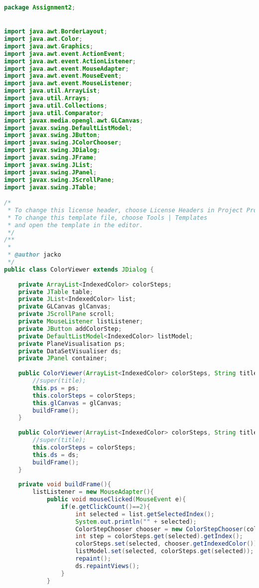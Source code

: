 \documentclass[pdftex,a4paper,10pt,titlepage]{article}
\begin{document}
\begin{lstlisting}[language=java, breaklines=true]
package Assignment2;


import java.awt.BorderLayout;
import java.awt.Color;
import java.awt.Graphics;
import java.awt.event.ActionEvent;
import java.awt.event.ActionListener;
import java.awt.event.MouseAdapter;
import java.awt.event.MouseEvent;
import java.awt.event.MouseListener;
import java.util.ArrayList;
import java.util.Arrays;
import java.util.Collections;
import java.util.Comparator;
import javax.media.opengl.awt.GLCanvas;
import javax.swing.DefaultListModel;
import javax.swing.JButton;
import javax.swing.JColorChooser;
import javax.swing.JDialog;
import javax.swing.JFrame;
import javax.swing.JList;
import javax.swing.JPanel;
import javax.swing.JScrollPane;
import javax.swing.JTable;

/*
 * To change this license header, choose License Headers in Project Properties.
 * To change this template file, choose Tools | Templates
 * and open the template in the editor.
 */
/**
 *
 * @author jacko
 */
public class ColorViewer extends JDialog {
    
    private ArrayList<IndexedColor> colorSteps;
    private JTable table;
    private JList<IndexedColor> list;
    private GLCanvas glCanvas;
    private JScrollPane scroll;
    private MouseListener listListener;
    private JButton addColorStep;
    private DefaultListModel<IndexedColor> listModel;
    private PlaneVisualisation ps;
    private DataSetVisualiser ds;
    private JPanel container;
    
    public ColorViewer(ArrayList<IndexedColor> colorSteps, String title, GLCanvas glCanvas, PlaneVisualisation ps){
        //super(title);
        this.ps = ps;
        this.colorSteps = colorSteps;
        this.glCanvas = glCanvas;
        buildFrame();
    }
    
    public ColorViewer(ArrayList<IndexedColor> colorSteps, String title, DataSetVisualiser ds){
        //super(title);
        this.colorSteps = colorSteps;
        this.ds = ds;
        buildFrame();
    }
    
    private void buildFrame(){
        listListener = new MouseAdapter(){
            public void mouseClicked(MouseEvent e){
                if(e.getClickCount()==2){
                    int selected = list.getSelectedIndex();
                    System.out.println("" + selected);
                    ColorStepChooser chooser = new ColorStepChooser(colorSteps.get(selected));
                    int step = colorSteps.get(selected).getIndex();
                    colorSteps.set(selected, chooser.getIndexedColor());
                    listModel.set(selected, colorSteps.get(selected));
                    repaint();
                    ds.repaintViews();
                }
            }
            

\end{lstlisting}
\end{document}
